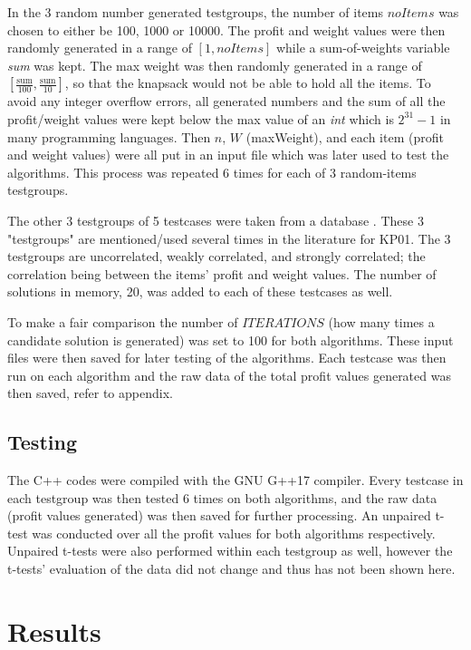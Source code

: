 \documentclass[titlepage]{article}
\begin{document}
In the 3 random number generated testgroups, the number of items $noItems$ was chosen to either be 100, 1000 or 10000. The profit and weight values were then randomly generated in a range of $ [1, noItems] $ while a sum-of-weights variable \emph{sum} was kept. The max weight was then randomly generated in a range of $[\frac{\text{sum}}{100} , \frac{\text{sum}}{10}]$, so that the knapsack would not be able to hold all the items. To avoid any integer overflow errors, all generated numbers and the sum of all the profit/weight values were kept below the max value of an \emph{int} which is $2^{31}-1$ in many programming languages.  Then $n$, $W$ (maxWeight), and each item (profit and weight values) were all put in an input file which was later used to test the algorithms. This process was repeated 6 times for each of 3 random-items testgroups.

The other 3 testgroups of 5 testcases were taken from a database \cite{dataset}. These 3 "testgroups" are mentioned/used several times in the literature for KP01. The 3 testgroups are uncorrelated, weakly correlated, and strongly correlated; the correlation being between the items' profit and weight values. The number of solutions in memory, 20, was added to each of these testcases as well. 

To make a fair comparison the number of $ITERATIONS$ (how many times a candidate solution is generated) was set to 100 for both algorithms. These input files were then saved for later testing of the algorithms. Each testcase was then run on each algorithm and the raw data of the total profit values generated was then saved, refer to appendix.

\subsection{Testing}
The C++ codes were compiled with the GNU G++17 compiler. Every testcase in each testgroup was then tested 6 times on both algorithms, and the raw data (profit values generated) was then saved for further processing. An unpaired t-test was conducted over all the profit values for both algorithms respectively. Unpaired t-tests were also performed within each testgroup as well, however the t-tests' evaluation of the data did not change and thus has not been shown here. 

\newpage

\section{Results}
\end{document}
